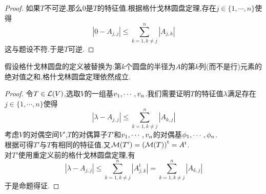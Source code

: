 \documentclass{ctexart}
\begin{document}
\begin{proof}
    如果$T$不可逆,那么$0$是$T$的特征值.根据格什戈林圆盘定理,存在$j\in\{1,\cdots,n\}$使得
    \[\left|0-A_{j,j}\right|\leqslant\sum_{k=1,k\neq j}^n\left|A_{j,k}\right|\]
    这与题设不符.于是$T$可逆.
\end{proof}
\begin{problem}[23.]
    假设格什戈林圆盘的定义被替换为:第$k$个圆盘的半径为$A$的第$k$列(而不是行)元素的绝对值之和,格什戈林圆盘定理依然成立.
\end{problem}
\begin{proof}
    令$T\in\mathcal{L}(V)$,选取$V$的一组基${v}_1,\cdots,{v}_{n}$.我们需要证明$T$的特征值$\lambda$满足存在$j\in\{1,\cdots,n\}$使得
    \[\left|\lambda-A_{j,j}\right|\leqslant\sum_{k=1,k\neq j}^n\left|A_{k,j}\right|\]
    考虑$V$的对偶空间$V'$,$T$的对偶算子$T'$和${v}_1,\cdots,{v}_{n}$的对偶基${\phi}_1,\cdots,{\phi}_{n}$.\\
    根据可得$T'$与$T$有相同的特征值.又$\mathcal{M}(T')=\left(\mathcal{M}(T)\right)^\text{t}=A^{\text t}$.\\
    对$T'$使用重定义前的格什戈林圆盘定理,有
    \[\left|\lambda-A_{j,j}\right|\leqslant\sum_{k=1,k\neq j}^n\left|A^{\text{t}}_{j,k}\right|=\sum_{k=1,k\neq j}^n\left|A_{k,j}\right|\]
    于是命题得证.
\end{proof}
\end{document}
